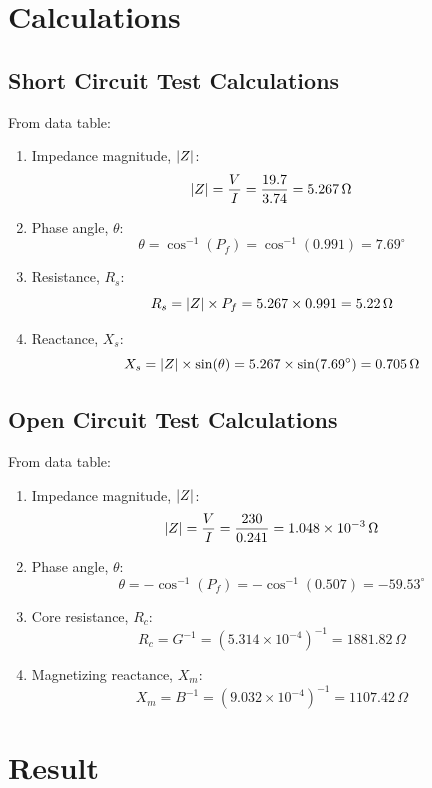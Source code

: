 \documentclass[a4paper,12pt]{article}
\begin{document}
	\section{Calculations}
	\subsection{Short Circuit Test Calculations}
	


	
	From data table:
	\begin{enumerate}
		\item Impedance magnitude, $\abs{Z}$:
		\[
		\abs{Z} = \frac{V}{I} = \frac{19.7}{3.74} = 5.267 \, \Omega
		\]
		
		\item Phase angle, $\theta$:
		\[
		\theta = \cos^{-1}(P_f) = \cos^{-1}(0.991) = 7.69^\circ
		\]
		
		\item Resistance, $R_s$:
		\[
		R_s = \abs{Z} \times P_f = 5.267 \times 0.991 = 5.22 \, \Omega
		\]
		
		\item Reactance, $X_s$:
		\[
		X_s = \abs{Z} \times \sin(\theta) = 5.267 \times \sin(7.69^\circ) = 0.705 \, \Omega
		\]
	\end{enumerate}
	
	\subsection{Open Circuit Test Calculations}
	

From data table:
	\begin{enumerate}
		\item Impedance magnitude, $\abs{Z}$:
		\[
		\abs{Z} = \frac{V}{I} = \frac{230}{0.241} = 1.048 \times 10^{-3} \, \Omega
		\]
		
		\item Phase angle, $\theta$:
		\[
		\theta = -\cos^{-1}(P_f) = -\cos^{-1}(0.507) = -59.53^\circ
		\]
		
		\item Core resistance, $R_c$:
		\[
	R_c=G^{-1} = (5.314\times10^{-4})^{-1}  = 1881.82 \, \Omega
		\]
		
		\item Magnetizing reactance, $X_m$:
		\[
		X_m=B^{-1}= (9.032\times10^{-4})^{-1} = 1107.42 \, \Omega
		\]
	\end{enumerate}
	\newpage

	\section{Result}
	
\end{document}
